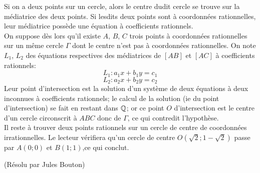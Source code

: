 \begin{sol}[75]
\begin{sol}[133]
		Si on a deux points sur un cercle, alors le centre dudit cercle se trouve sur la m\'ediatrice des deux points. Si lesdits deux points sont \`a coordonn\'ees rationnelles, leur m\'ediatrice poss\`ede une \'equation \`a coefficients rationnels. \\
			On suppose d\`es lors qu'il existe $A$, $B$, $C$ trois points \`a coordonn\'ees rationnelles sur un m\^eme cercle $\Gamma$ dont le centre n'est pas \`a coordonn\'ees rationnelles. On note $L_1$, $L_2$ des \'equations respectives des m\'ediatrices de $[AB]$ et $[AC]$ \`a coefficients rationnels:
			\[L_1: a_1x+b_1y=c_1\]
			\[L_2: a_2x+b_2y=c_2\]
			Leur point d'intersection est la solution d'un syst\`eme de deux \'equations \`a deux inconnues \`a coefficients rationnels; le calcul de la solution (ie du point d'intersection) se fait en restant dans $\mathbb Q$; or ce point $O$ d'intersection est le centre d'un cercle circonscrit \`a $ABC$ donc de $\Gamma$, ce qui contredit l'hypoth\`ese. \\
			Il reste \`a trouver deux points rationnels sur un cercle de centre de coordonn\'ees irrationnelles. Le lecteur v\'erifiera qu'un cercle de centre $O(\sqrt{2};1-\sqrt{2})$ passe par $A(0;0)$ et $B(1;1)$,ce qui conclut.  
\end{sol}

\begin{sol}[13](R\'esolu par Jules Bouton)



\end{sol}
\end{sol}
